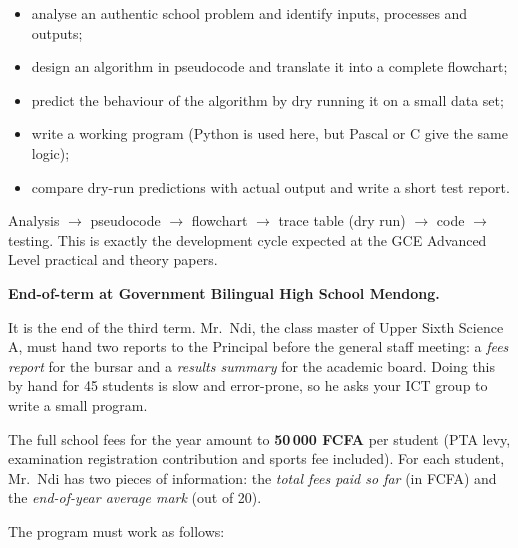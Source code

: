 \documentclass[11pt]{article}
\newcounter{popsec}
\newcounter{popsub}
\newcommand{\courssub}[1]{%
  \stepcounter{popsub}%
  \par\vspace{9pt}\noindent{\popxbold\fontsize{11.5}{13}\selectfont\color{popink}{\color{poporange}\thepopsec.\thepopsub}\hspace{6pt}#1}\par\nopagebreak\vspace{4pt}
}
\begin{document}
\begin{itemize}
\item analyse an authentic school problem and identify inputs, processes and outputs;
\item design an algorithm in pseudocode and translate it into a complete flowchart;
\item predict the behaviour of the algorithm by dry running it on a small data set;
\item write a working program (Python is used here, but Pascal or C give the same logic);
\item compare dry-run predictions with actual output and write a short test report.
\end{itemize}

\begin{aretenir}
Analysis $\rightarrow$ pseudocode $\rightarrow$ flowchart $\rightarrow$ trace table (dry run) $\rightarrow$ code $\rightarrow$ testing. This is exactly the development cycle expected at the GCE Advanced Level practical and theory papers.
\end{aretenir}

\courssub{Situation}

\textbf{End-of-term at Government Bilingual High School Mendong.}\par
It is the end of the third term. Mr.\ Ndi, the class master of Upper Sixth Science A, must hand two reports to the Principal before the general staff meeting: a \emph{fees report} for the bursar and a \emph{results summary} for the academic board. Doing this by hand for 45 students is slow and error-prone, so he asks your ICT group to write a small program.

The full school fees for the year amount to \textbf{50\,000 FCFA} per student (PTA levy, examination registration contribution and sports fee included). For each student, Mr.\ Ndi has two pieces of information: the \emph{total fees paid so far} (in FCFA) and the \emph{end-of-year average mark} (out of 20).

The program must work as follows:
\end{document}
